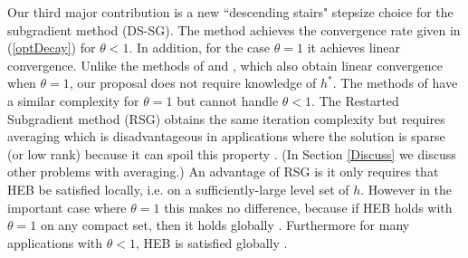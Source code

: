 \documentclass[smallextended]{svjour3}
\begin{document}
Our third major contribution is  a new ``descending stairs" stepsize choice for the subgradient method (DS-SG). The method achieves the convergence rate given in (\ref{optDecay}) for $\theta<1$. In addition, for the case $\theta=1$ it achieves linear convergence. Unlike the methods of \cite{renegar2015framework,renegar2016efficient} and \cite[Exercise 6.3.3]{bertsekas1999nonlinear}, which also obtain linear convergence when $\theta=1$, our proposal does not require knowledge of $h^*$. The methods of \cite{supittayapornpong2016staggered,shor2012minimization,goffin1977convergence} have a similar complexity for $\theta=1$ but cannot handle $\theta<1$. The Restarted Subgradient method (RSG) \cite{yang2015rsg} obtains the same iteration complexity but requires averaging which is disadvantageous in applications where the solution is sparse (or low rank) because it can spoil this property \cite{davis2017three}. (In Section \ref{Discuss} we discuss other problems with averaging.) An advantage of RSG is it only requires that HEB be satisfied locally, i.e. on a sufficiently-large level set of $h$. However in the important case where $\theta=1$ this makes no difference, because if HEB holds with $\theta=1$ on any compact set, then it holds globally \cite{burke1993weak}. Furthermore for many applications with $\theta<1$, HEB is satisfied globally \cite{bolte2015error,karimi2016linear}.   %

\end{document}
